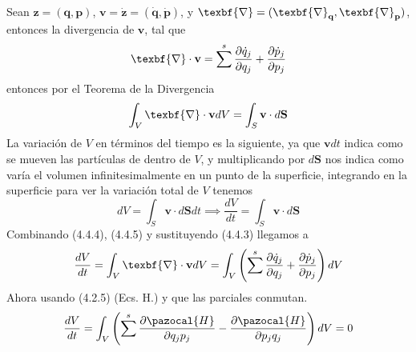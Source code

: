 Sean $\mathbf{z}=(\mathbf{q},\mathbf{p})$, $\mathbf{v}=\dot{\mathbf{z}}=(\dot{\mathbf{q}},\dot{\mathbf{p}})$, y $\texbf{\nabla} = (\texbf{\nabla}_\textbf{q},\texbf{\nabla}_\textbf{p})$, entonces la divergencia de $\mathbf{v}$, tal que
\begin{equation} \label{4.3.4}
    \texbf{\nabla} \cdot \mathbf{v} = \sum^s \frac{\partial \dot{q}_j}{\partial q_j} + \frac{\partial \dot{p}_j}{\partial p_j}
\end{equation} 
entonces por el Teorema de la Divergencia
\begin{equation} \label{4.3.5}
    \int_V{\texbf{\nabla} \cdot \mathbf{v} dV} = \int_S \mathbf{v} \cdot d\mathbf{S}
\end{equation} 
La variación de $V$ en términos del tiempo es la siguiente, ya que $\mathbf{v}dt$ indica como se mueven las partículas de dentro de $V$, y multiplicando por $d\mathbf{S}$ nos indica como varía el volumen infinitesimalmente en un punto de la superficie, integrando en la superficie para ver la variación total de $V$ tenemos
\begin{equation} \label{4.3.6}
    dV=\int_S \mathbf{v} \cdot d\mathbf{S} dt \implies \frac{dV}{dt} = \int_S \mathbf{v} \cdot d\mathbf{S}
\end{equation} 
Combinando (4.4.4), (4.4.5) y sustituyendo (4.4.3) llegamos a 
\begin{equation} \label{4.3.7}
    \frac{dV}{dt} = \int_V{\texbf{\nabla} \cdot \mathbf{v} dV} = \int_V{\left(\sum^s \frac{\partial \dot{q}_j}{\partial q_j} + \frac{\partial \dot{p}_j}{\partial p_j}\right)dV}
\end{equation} 
Ahora usando (4.2.5) (Ecs. H.) y que las parciales conmutan.
\begin{equation} \label{4.3.8}
    \frac{dV}{dt} = \int_V{\left(\sum^s \frac{\partial \pazocal{H}}{\partial q_j p_j} - \frac{\partial \pazocal{H}}{\partial p_j q_j}\right)dV} = 0
\end{equation} 
